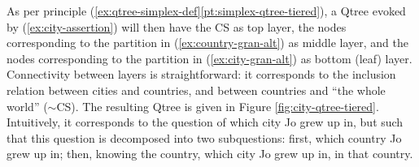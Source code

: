 \begin{exe}
	\label{ex:country-gran-alt}
\end{exe} 

As per principle (\ref{ex:qtree-simplex-def}\ref{pt:simplex-qtree-tiered}), a Qtree evoked by (\ref{ex:city-assertion}) will then have the CS as top layer, the nodes corresponding to the partition in (\ref{ex:country-gran-alt}) as middle layer, and the nodes corresponding to the partition in (\ref{ex:city-gran-alt}) as bottom (leaf) layer. Connectivity between layers is straightforward: it corresponds to the inclusion relation between cities and countries, and between countries and ``the whole world'' ($\sim$CS). The resulting Qtree is given in Figure \ref{fig:city-qtree-tiered}. Intuitively, it corresponds to the question of which city Jo grew up in, but such that this question is decomposed into two subquestions: first, which country Jo grew up in; then, knowing the country, which city Jo grew up in, in that country.


